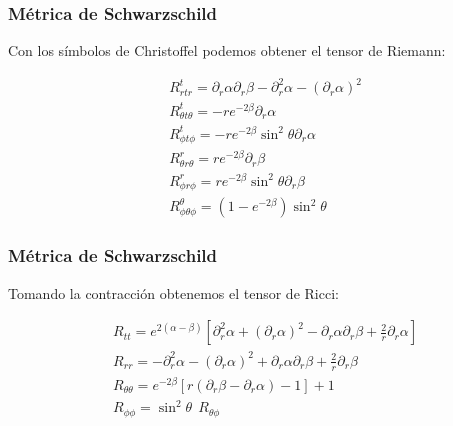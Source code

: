 \documentclass{beamer}
\begin{document}


\begin{frame}
\frametitle{Métrica de Schwarzschild}

Con los símbolos de Christoffel podemos obtener el tensor de Riemann: 

\begin{align*}
  &R_{r t r}^{t}=\partial_r \alpha \partial_r \beta-\partial_r^2 \alpha-(\partial_r \alpha)^2 \\
  &R_{\theta t \theta }^{t}=-r e^{-2 \beta} \partial_r \alpha \\
  &R_{\phi t \phi}^t=-r e^{-2 \beta} \sin ^2 \theta \partial_r \alpha \\
  &R_{\theta r \theta}^r=r e^{-2 \beta} \partial_r \beta \\
  &R_{\phi r \phi}^{r}=r e^{-2 \beta} \sin ^2 \theta \partial_r \beta \\
  &R _{\phi \theta \phi } ^ {\theta }=\left(1-e^{-2 \beta}\right) \sin ^2 \theta 
\end{align*}


\end{frame}




\begin{frame}
\frametitle{Métrica de Schwarzschild}

Tomando la contracción obtenemos el tensor de Ricci: 

\begin{align*}
  &R_{t t}=e^{2(\alpha-\beta)}\left[\partial_r^2 \alpha+\left(\partial_r \alpha\right)^2-\partial_r \alpha \partial_r \beta+\frac{2}{r} \partial_r \alpha\right] \\
  &R_{r r}=-\partial_r^2 \alpha-\left(\partial_r \alpha\right)^2+\partial_r \alpha \partial_r \beta+\frac{2}{r} \partial_r \beta \\
  &R_{\theta \theta}=e^{-2 \beta}\left[r\left(\partial_r \beta-\partial_r \alpha\right)-1\right]+1 \\
  &R_{\phi \phi}=\sin ^2 \theta \ \ R_{\theta \phi}
\end{align*}


\end{frame}

\end{document}

